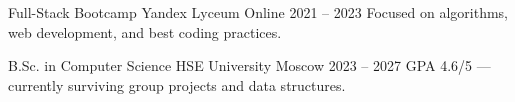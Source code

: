 
\cventry
  {Full-Stack Bootcamp}
  {Yandex Lyceum}
  {Online}
  {2021 -- 2023}
  {Focused on algorithms, web development, and best coding practices.}

\vspace{-0.5\baselineskip}

\cventry
  {B.Sc. in Computer Science}
  {HSE University}
  {Moscow}
  {2023 -- 2027}
  {GPA 4.6/5 — currently surviving group projects and data structures.}
